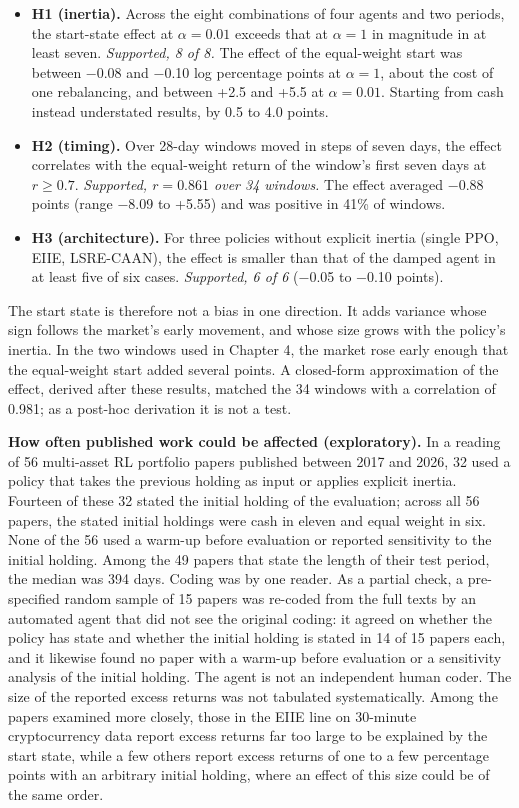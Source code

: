 \documentclass[12pt,a4paper]{report}
\providecommand{\tightlist}{\setlength{\itemsep}{0pt}\setlength{\parskip}{0pt}}
\begin{document}
\begin{itemize}
\tightlist
\item
  \textbf{H1 (inertia).} Across the eight combinations of four agents
  and two periods, the start-state effect at \(\alpha = 0.01\) exceeds
  that at \(\alpha = 1\) in magnitude in at least seven.
  \emph{Supported, 8 of 8.} The effect of the equal-weight start was
  between −0.08 and −0.10 log percentage points at \(\alpha=1\), about
  the cost of one rebalancing, and between +2.5 and +5.5 at
  \(\alpha=0.01\). Starting from cash instead understated results, by
  0.5 to 4.0 points.
\item
  \textbf{H2 (timing).} Over 28-day windows moved in steps of seven
  days, the effect correlates with the equal-weight return of the
  window's first seven days at \(r \geq 0.7\). \emph{Supported,
  \(r = 0.861\) over 34 windows.} The effect averaged −0.88 points
  (range −8.09 to +5.55) and was positive in 41\% of windows.
\item
  \textbf{H3 (architecture).} For three policies without explicit
  inertia (single PPO, EIIE, LSRE-CAAN), the effect is smaller than that
  of the damped agent in at least five of six cases. \emph{Supported, 6
  of 6} (−0.05 to −0.10 points).
\end{itemize}

The start state is therefore not a bias in one direction. It adds
variance whose sign follows the market's early movement, and whose size
grows with the policy's inertia. In the two windows used in Chapter 4,
the market rose early enough that the equal-weight start added several
points. A closed-form approximation of the effect, derived after these
results, matched the 34 windows with a correlation of 0.981; as a
post-hoc derivation it is not a test.

\textbf{How often published work could be affected (exploratory).} In a
reading of 56 multi-asset RL portfolio papers published between 2017 and
2026, 32 used a policy that takes the previous holding as input or
applies explicit inertia. Fourteen of these 32 stated the initial
holding of the evaluation; across all 56 papers, the stated initial
holdings were cash in eleven and equal weight in six. None of the 56
used a warm-up before evaluation or reported sensitivity to the initial
holding. Among the 49 papers that state the length of their test period,
the median was 394 days. Coding was by one reader. As a partial check, a
pre-specified random sample of 15 papers was re-coded from the full
texts by an automated agent that did not see the original coding: it
agreed on whether the policy has state and whether the initial holding
is stated in 14 of 15 papers each, and it likewise found no paper with a
warm-up before evaluation or a sensitivity analysis of the initial
holding. The agent is not an independent human coder. The size of the
reported excess returns was not tabulated systematically. Among the
papers examined more closely, those in the EIIE line on 30-minute
cryptocurrency data report excess returns far too large to be explained
by the start state, while a few others report excess returns of one to a
few percentage points with an arbitrary initial holding, where an effect
of this size could be of the same order.
\end{document}
